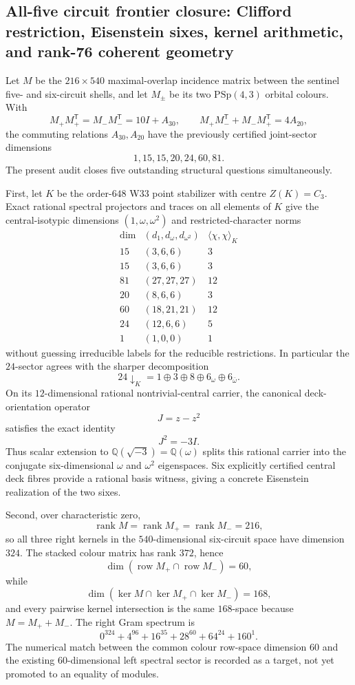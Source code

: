 \subsection{All-five circuit frontier closure: Clifford restriction, Eisenstein sixes, kernel arithmetic, and rank-76 coherent geometry}
\label{sec:all5-circuit-frontier-20260831}

Let $M$ be the $216\times540$ maximal-overlap incidence matrix between the sentinel five- and six-circuit shells, and let $M_\pm$ be its two $\mathrm{PSp}(4,3)$ orbital colours.  With
\[
M_+M_+^{\mathsf T}=M_-M_-^{\mathsf T}=10I+A_{30},\qquad
M_+M_-^{\mathsf T}+M_-M_+^{\mathsf T}=4A_{20},
\]
the commuting relations $A_{30},A_{20}$ have the previously certified joint-sector dimensions
\[
1,15,15,20,24,60,81.
\]
The present audit closes five outstanding structural questions simultaneously.

First, let $K$ be the order-$648$ W33 point stabilizer with centre $Z(K)=C_3$.  Exact rational spectral projectors and traces on all elements of $K$ give the central-isotypic dimensions $(1,\omega,\omega^2)$ and restricted-character norms
\[
\begin{array}{c|c|c}
\dim & (d_1,d_\omega,d_{\omega^2}) & \langle\chi,\chi\rangle_K\\ \hline
15&(3,6,6)&3\\
15&(3,6,6)&3\\
81&(27,27,27)&12\\
20&(8,6,6)&3\\
60&(18,21,21)&12\\
24&(12,6,6)&5\\
1&(1,0,0)&1
\end{array}
\]
without guessing irreducible labels for the reducible restrictions.  In particular the $24$-sector agrees with the sharper decomposition
\[
24\downarrow_K=1\oplus3\oplus8\oplus6_\omega\oplus6_{\bar\omega}.
\]
On its $12$-dimensional rational nontrivial-central carrier, the canonical deck-orientation operator
\[
J=z-z^2
\]
satisfies the exact identity
\[
\boxed{J^2=-3I}.
\]
Thus scalar extension to $\mathbb Q(\sqrt{-3})=\mathbb Q(\omega)$ splits this rational carrier into the conjugate six-dimensional $\omega$ and $\omega^2$ eigenspaces.  Six explicitly certified central deck fibres provide a rational basis witness, giving a concrete Eisenstein realization of the two sixes.

Second, over characteristic zero,
\[
\operatorname{rank}M=\operatorname{rank}M_+=\operatorname{rank}M_-=216,
\]
so all three right kernels in the $540$-dimensional six-circuit space have dimension $324$.  The stacked colour matrix has rank $372$, hence
\[
\boxed{\dim(\operatorname{row}M_+\cap\operatorname{row}M_-)=60},
\]
while
\[
\boxed{\dim(\ker M\cap\ker M_+\cap\ker M_-)=168},
\]
and every pairwise kernel intersection is the same $168$-space because $M=M_++M_-$.  The right Gram spectrum is
\[
0^{324}+4^{96}+16^{35}+28^{60}+64^{24}+160^1.
\]
The numerical match between the common colour row-space dimension $60$ and the existing $60$-dimensional left spectral sector is recorded as a target, not yet promoted to an equality of modules.

